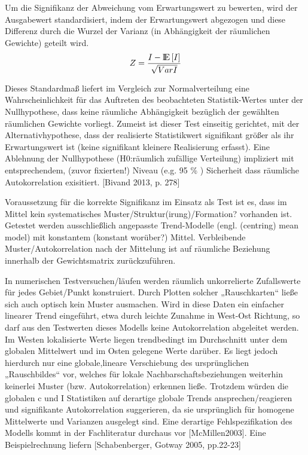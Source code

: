 Um die Signifikanz der Abweichung vom Erwartungswert zu bewerten, wird der Ausgabewert standardisiert, 
indem der Erwartungswert abgezogen und diese Differenz durch die Wurzel der Varianz (in Abhängigkeit der räumlichen Gewichte) geteilt wird. 
\begin{equation*}
    Z = \frac{I- {\rm I\!E} \left[ I \right] } {\sqrt{Var{I}}}
\end{equation*}

Dieses Standardmaß liefert im Vergleich zur Normalverteilung eine Wahrscheinlichkeit für das Auftreten des beobachteten Statistik-Wertes unter der Nullhypothese, 
dass keine räumliche Abhängigkeit bezüglich der gewählten räumlichen Gewichte vorliegt. 
Zumeist ist dieser Test einseitig gerichtet, mit der Alternativhypothese, dass der realisierte Statistikwert signifikant größer als ihr 
Erwartungswert ist (keine signifikant kleinere Realisierung erfasst). 
Eine Ablehnung der Nullhypothese (H0:räumlich zufällige Verteilung) impliziert mit entsprechendem, (zuvor fixierten!) Niveau (e.g. 95 \% ) Sicherheit 
dass räumliche Autokorrelation exisitiert. [Bivand 2013, p. 278]

Voraussetzung für die korrekte Signifikanz im Einsatz als Test ist es, dass im Mittel kein systematisches Muster/Struktur(irung)/Formation? vorhanden ist. 
Getestet werden ausschließlich angepasste Trend-Modelle (engl. (centring) mean model) mit konstantem (konstant worüber?) Mittel. 
Verbleibende Muster/Autokorrelation nach der Mittelung ist auf räumliche Beziehung innerhalb der Gewichtsmatrix zurückzuführen. 

In numerischen Testversuchen/läufen werden räumlich unkorrelierte Zufallswerte für jedes Gebiet/Punkt konstruiert. 
Durch Plotten solcher „Rauschkarten“ ließe sich auch optisch kein Muster ausmachen. 
Wird in diese Daten ein einfacher linearer Trend eingeführt, etwa durch leichte Zunahme in West-Ost Richtung, 
so darf aus den Testwerten dieses Modells keine Autokorrelation abgeleitet werden. 
Im Westen lokalisierte Werte liegen trendbedingt im Durchschnitt unter dem globalen Mittelwert und im Osten gelegene Werte darüber. 
Es liegt jedoch hierdurch nur eine globale,lineare Verschiebung des ursprünglichen „Rauschbildes“ vor, 
welches für lokale Nachbarschaftsbeziehungen weiterhin keinerlei Muster (bzw. Autokorrelation) erkennen ließe. 
Trotzdem würden die globalen c und I Statistiken auf derartige globale Trends ansprechen/reagieren und signifikante Autokorrelation suggerieren, 
da sie ursprünglich für homogene Mittelwerte und Varianzen ausgelegt sind. 
Eine derartige Fehlspezifikation des Modells kommt in der Fachliteratur durchaus vor [McMillen2003]. 
Eine Beispielrechnung liefern [Schabenberger, Gotway 2005, pp.22-23]

